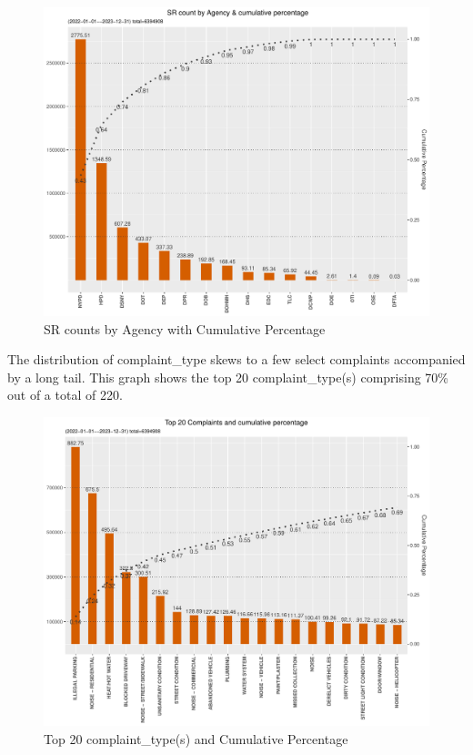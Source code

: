 \documentclass[12pt, titlepage]{article}
\begin{document}
\begin{figure}[tbp]
	\centering
	\includegraphics[width=\textwidth]{SRs_by_Agency.pdf}
  	\caption{SR counts by Agency with Cumulative Percentage}
	\label{fig:SRcountbyAgency}
\end{figure}

The distribution of complaint\_type skews to a few select complaints accompanied by a long tail.
This graph shows the top 20 complaint\_type(s) comprising 70\% out of a total of 220.

\begin{figure}[tbp]
  \centering
 	\includegraphics[width=\textwidth]{SR_by_Complaint_Type.pdf} 
	\caption{Top 20 complaint\_type(s) and Cumulative Percentage} 
	\label{fig:SR_complaints}
\end{figure}
\end{document}
